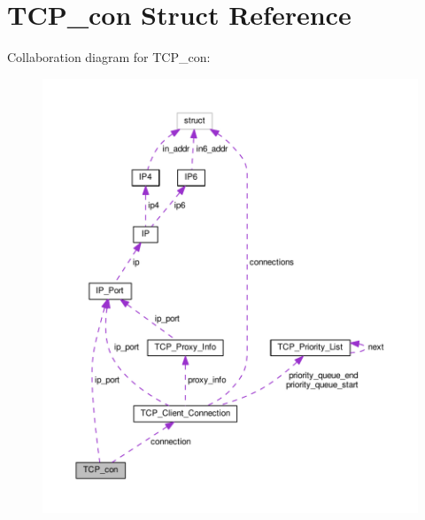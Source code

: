 \hypertarget{struct_t_c_p__con}{\section{T\+C\+P\+\_\+con Struct Reference}
\label{struct_t_c_p__con}
}


Collaboration diagram for T\+C\+P\+\_\+con\+:
\nopagebreak
\begin{figure}[H]
\begin{center}
\leavevmode
\includegraphics[width=350pt]{struct_t_c_p__con__coll__graph}
\end{center}
\end{figure}
